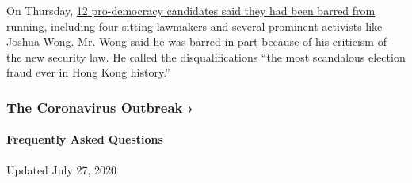 On Thursday,
\href{https://www.nytimes.com/2020/07/29/world/asia/hong-kong-arrests-security-law.html}{12
pro-democracy candidates said they had been barred from running},
including four sitting lawmakers and several prominent activists like
Joshua Wong. Mr. Wong said he was barred in part because of his
criticism of the new security law. He called the disqualifications ``the
most scandalous election fraud ever in Hong Kong history.''

\href{https://www.nytimes.com/news-event/coronavirus?action=click\&pgtype=Article\&state=default\&region=MAIN_CONTENT_3\&context=storylines_faq}{}

\hypertarget{the-coronavirus-outbreak-}{%
\subsubsection{The Coronavirus Outbreak
›}\label{the-coronavirus-outbreak-}}

\hypertarget{frequently-asked-questions}{%
\paragraph{Frequently Asked
Questions}\label{frequently-asked-questions}}

Updated July 27, 2020

